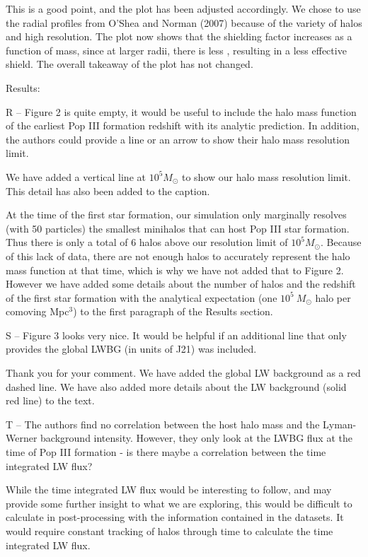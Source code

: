 \documentclass[11pt]{article}
\newenvironment{referee}[1][]{%
    \ignorespaces%
    \begin{mdframed}[style=myquotestyle,#1]%
}{%
    \end{mdframed}%
    \ignorespacesafterend%
}%
\begin{document}
This is a good point, and the plot has been adjusted accordingly. We chose to use the \hh{} radial profiles from O'Shea and Norman (2007) because of the variety of halos and high resolution. The plot now shows that the shielding factor increases as a function of mass, since at larger radii, there is less \hh{}, resulting in a less effective \hh{} shield. The overall takeaway of the plot has not changed. 

\begin{referee}
Results:

R -- Figure 2 is quite empty, it would be useful to include the halo mass function of the earliest Pop III formation redshift with its analytic prediction. In addition, the authors could provide a line or an arrow to show their halo mass resolution limit.
\end{referee}
We have added a vertical line at $10^5 M_{\odot}$ to show our halo mass resolution limit. This detail has also been added to the caption.

At the time of the first star formation, our simulation only marginally resolves (with 50 particles) the smallest minihalos that can host Pop III star formation. Thus there is only a total of 6 halos above our resolution limit of $10^{5} M_{\odot}$. Because of this lack of data, there are not enough halos to accurately represent the halo mass function at that time, which is why we have not added that to Figure 2.  However we have added some details about the number of halos and the redshift of the first star formation with the analytical expectation (one $10^5~M_\odot$ halo per comoving Mpc$^3$) to the first paragraph of the Results section. 

\begin{referee}
S -- Figure 3 looks very nice. It would be helpful if an additional line that only 
provides the global LWBG (in units of J21) was included.
\end{referee}
Thank you for your comment. We have added the global LW background as a red dashed line. We have also added more details about the LW background (solid red line) to the text.

\begin{referee}
T -- The authors find no correlation between the host halo mass and the Lyman-Werner background intensity. However, they only look at the LWBG flux at the time of Pop III formation - is there maybe a correlation between the time integrated LW flux?
\end{referee}
While the time integrated LW flux would be interesting to follow, and may provide some further insight to what we are exploring, this would be difficult to calculate in post-processing with the information contained in the datasets. It would require constant tracking of halos through time to calculate the time integrated LW flux. 
\end{document}
